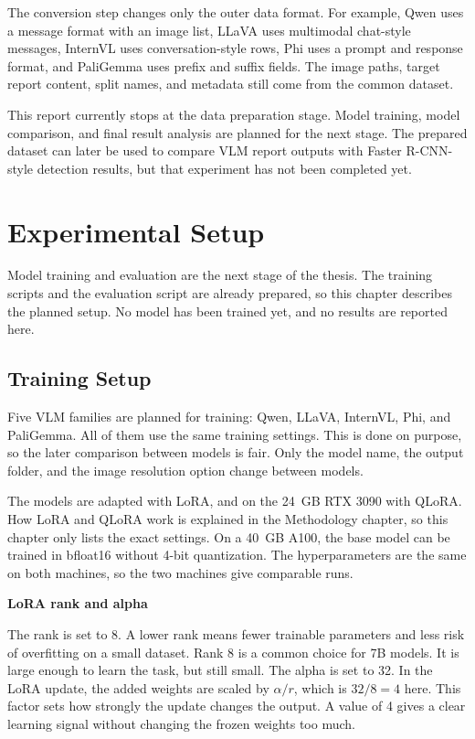 \documentclass[a4paper,12pt]{report}
\newcommand{\minisection}[1]{%
  \vspace{1ex}
  \noindent\textbf{#1}\par
  \vspace{0.5ex}
}
\begin{document}
The conversion step changes only the outer data format. For example, Qwen uses a message format with an image list, LLaVA uses multimodal chat-style messages, InternVL uses conversation-style rows, Phi uses a prompt and response format, and PaliGemma uses prefix and suffix fields. The image paths, target report content, split names, and metadata still come from the common dataset.

This report currently stops at the data preparation stage. Model training, model comparison, and final result analysis are planned for the next stage. The prepared dataset can later be used to compare VLM report outputs with Faster R-CNN-style detection results, but that experiment has not been completed yet.

\chapter{Experimental Setup}

Model training and evaluation are the next stage of the thesis. The training scripts and the evaluation script are already prepared, so this chapter describes the planned setup. No model has been trained yet, and no results are reported here.

\section{Training Setup}

Five VLM families are planned for training: Qwen, LLaVA, InternVL, Phi, and PaliGemma. All of them use the same training settings. This is done on purpose, so the later comparison between models is fair. Only the model name, the output folder, and the image resolution option change between models.

The models are adapted with LoRA, and on the 24~GB RTX 3090 with QLoRA. How LoRA and QLoRA work is explained in the Methodology chapter, so this chapter only lists the exact settings. On a 40~GB A100, the base model can be trained in bfloat16 without 4-bit quantization. The hyperparameters are the same on both machines, so the two machines give comparable runs.

\minisection{LoRA rank and alpha}

The rank is set to 8. A lower rank means fewer trainable parameters and less risk of overfitting on a small dataset. Rank 8 is a common choice for 7B models. It is large enough to learn the task, but still small. The alpha is set to 32. In the LoRA update, the added weights are scaled by $\alpha / r$, which is $32 / 8 = 4$ here. This factor sets how strongly the update changes the output. A value of 4 gives a clear learning signal without changing the frozen weights too much.
\end{document}

